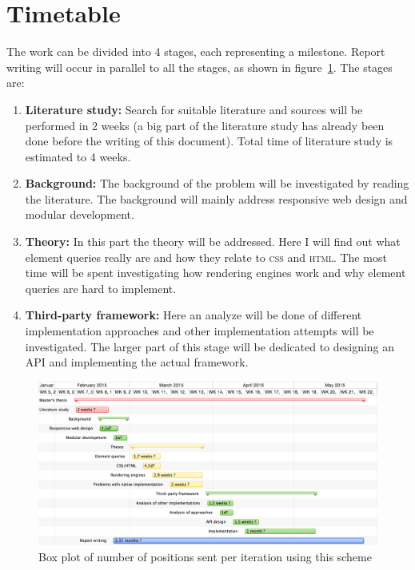 \documentclass[oneside,a4paper,11pt]{kth-mag}
\begin{document}
\section*{Timetable}
The work can be divided into 4 stages, each representing a milestone. Report writing will occur in parallel to all the stages, as shown in figure~\ref{fig:timetable}. The stages are:
\begin{enumerate}
\item \textbf{Literature study:} Search for suitable literature and sources will be performed in 2 weeks (a big part of the literature study has already been done before the writing of this document). Total time of literature study is estimated to 4 weeks.
\item \textbf{Background:} The background of the problem will be investigated by reading the literature. The background will mainly address responsive web design and modular development.
\item \textbf{Theory:} In this part the theory will be addressed. Here I will find out what element queries really are and how they relate to \textsc{css} and \textsc{html}. The most time will be spent investigating how rendering engines work and why element queries are hard to implement.
\item \textbf{Third-party framework:} Here an analyze will be done of different implementation approaches and other implementation attempts will be investigated. The larger part of this stage will be dedicated to designing an API and implementing the actual framework.
\end{enumerate}

\clearpage
\newpage

\begin{figure}
\centering
\includegraphics{timetable}
\caption{Box plot of number of positions sent per iteration using this scheme}
\label{fig:timetable}
\end{figure}
\restoregeometry
\end{document}
